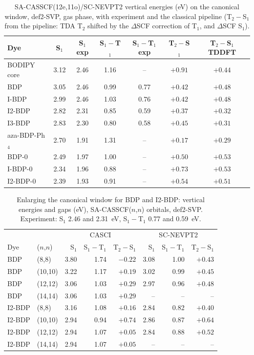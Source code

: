 \documentclass[journal=jctcce,manuscript=article]{achemso}
\begin{document}
\begin{table}
  \caption{SA-CASSCF(12e,11o)/SC-NEVPT2 vertical energies (eV) on the canonical window, def2-SVP, gas
  phase, with experiment and the classical pipeline (T$_2-$S$_1$ from the pipeline: TDA T$_2$ shifted by the $\Delta$SCF correction of T$_1$, and $\Delta$SCF S$_1$).}
  \label{tab:sanevpt2}
  \begin{tabular}{lcccccc}
    \toprule
    Dye & S$_1$ & S$_1$ exp & S$_1-$T$_1$ & S$_1-$T$_1$ exp & T$_2-$S$_1$ & T$_2-$S$_1$ TDDFT \\
    \midrule
    BODIPY core & 3.12 & 2.46 & 1.16 & --   & $+0.91$ & $+0.44$ \\
    BDP         & 3.05 & 2.46 & 0.99 & 0.77 & $+0.42$ & $+0.48$ \\
    I-BDP       & 2.99 & 2.46 & 1.03 & 0.76 & $+0.42$ & $+0.48$ \\
    I2-BDP      & 2.82 & 2.31 & 0.85 & 0.59 & $+0.37$ & $+0.32$ \\
    I3-BDP      & 2.83 & 2.30 & 0.80 & 0.58 & $+0.45$ & $+0.31$ \\
    aza-BDP-Ph$_4$ & 2.70 & 1.91 & 1.31 & --  & $+0.17$ & $+0.29$ \\
    \midrule
    BDP-0       & 2.49 & 1.97 & 1.00 & -- & $+0.50$ & $+0.53$ \\
    I-BDP-0     & 2.34 & 1.96 & 0.88 & -- & $+0.73$ & $+0.53$ \\
    I2-BDP-0    & 2.39 & 1.93 & 0.91 & -- & $+0.54$ & $+0.51$ \\
    \bottomrule
  \end{tabular}
\end{table}
\begin{table}
  \caption{Enlarging the canonical window for BDP and I2-BDP: vertical energies and gaps (eV),
  SA-CASSCF($n$,$n$) orbitals, def2-SVP. Experiment: S$_1$ 2.46 and 2.31~eV, S$_1-$T$_1$ 0.77 and 0.59~eV.}
  \label{tab:sweep}
  \footnotesize\setlength{\tabcolsep}{4pt}
  \begin{tabular}{llrrrrrr}
    \toprule
    & & \multicolumn{3}{c}{CASCI} & \multicolumn{3}{c}{SC-NEVPT2} \\
    Dye & ($n$,$n$) & S$_1$ & S$_1-$T$_1$ & T$_2-$S$_1$ & S$_1$ & S$_1-$T$_1$ & T$_2-$S$_1$ \\
    \midrule
    BDP    & (8,8)   & 3.80 & 1.74 & $-0.22$ & 3.08 & 1.00 & $+0.43$ \\
    BDP    & (10,10) & 3.22 & 1.17 & $+0.19$ & 3.02 & 0.99 & $+0.45$ \\
    BDP    & (12,12) & 3.06 & 1.03 & $+0.29$ & 2.97 & 0.96 & $+0.48$ \\
    BDP    & (14,14) & 3.06 & 1.03 & $+0.29$ & -- & -- & -- \\
    I2-BDP & (8,8)   & 3.16 & 1.08 & $+0.16$ & 2.84 & 0.82 & $+0.40$ \\
    I2-BDP & (10,10) & 2.94 & 0.94 & $+0.74$ & 2.86 & 0.87 & $+0.64$ \\
    I2-BDP & (12,12) & 2.94 & 1.07 & $+0.05$ & 2.84 & 0.88 & $+0.52$ \\
    I2-BDP & (14,14) & 2.94 & 1.07 & $+0.05$ & -- & -- & -- \\
    \bottomrule
  \end{tabular}
\end{table}
\end{document}
